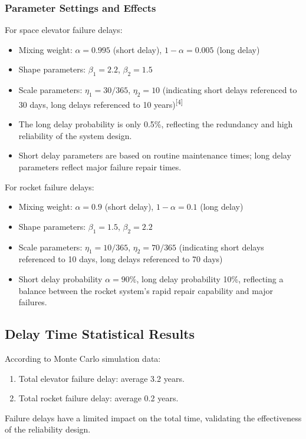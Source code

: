 \documentclass{article}
\begin{document}
\subsubsection{Parameter Settings and Effects}
For space elevator failure delays:
\begin{itemize}
    \item Mixing weight: $\alpha = 0.995$ (short delay), $1-\alpha = 0.005$ (long delay)
    \item Shape parameters: $\beta_1=2.2$, $\beta_2=1.5$
    \item Scale parameters: $\eta_1=30/365$, $\eta_2=10$ (indicating short delays referenced to 30 days, long delays referenced to 10 years)\textsuperscript{[4]}
    \item The long delay probability is only 0.5\%, reflecting the redundancy and high reliability of the system design.
    \item Short delay parameters are based on routine maintenance times; long delay parameters reflect major failure repair times.
\end{itemize}

For rocket failure delays:
\begin{itemize}
    \item Mixing weight: $\alpha = 0.9$ (short delay), $1-\alpha = 0.1$ (long delay)
    \item Shape parameters: $\beta_1=1.5$, $\beta_2=2.2$
    \item Scale parameters: $\eta_1=10/365$, $\eta_2=70/365$ (indicating short delays referenced to 10 days, long delays referenced to 70 days)
    \item Short delay probability $\alpha = 90\%$, long delay probability 10\%, reflecting a balance between the rocket system's rapid repair capability and major failures.
\end{itemize}

\subsection{Delay Time Statistical Results}
According to Monte Carlo simulation data:
\begin{enumerate}
    \item Total elevator failure delay: average 3.2 years.
    \item Total rocket failure delay: average 0.2 years.
\end{enumerate}
Failure delays have a limited impact on the total time, validating the effectiveness of the reliability design.
\end{document}
